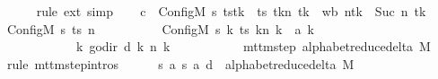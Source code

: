 \begin{isabellebody}
\ \ \ \ \isamarkupfalse%
\ {\isacharparenleft}{\kern0pt}rule\ ext{\isacharparenright}{\kern0pt}\ simp\isanewline
\ \ \isamarkupfalse%
\ {\isacharquery}{\kern0pt}c{\isacharprime}{\kern0pt}{\isacharprime}{\kern0pt}\ {\isacharequal}{\kern0pt}\ {\isachardoublequoteopen}Config\isactrlsub M\ {\isacharquery}{\kern0pt}s{\isacharprime}{\kern0pt}\ {\isacharparenleft}{\kern0pt}ts{\isacharparenleft}{\kern0pt}tk\ {\isacharcolon}{\kern0pt}{\isacharequal}{\kern0pt}\ {\isacharparenleft}{\kern0pt}ts\ tk{\isacharparenright}{\kern0pt}{\isacharparenleft}{\kern0pt}n\ tk\ {\isacharcolon}{\kern0pt}{\isacharequal}{\kern0pt}\ {\isacharquery}{\kern0pt}wb{\isacharparenright}{\kern0pt}{\isacharparenright}{\kern0pt}{\isacharparenright}{\kern0pt}\ {\isacharparenleft}{\kern0pt}n{\isacharparenleft}{\kern0pt}tk\ {\isacharcolon}{\kern0pt}{\isacharequal}{\kern0pt}\ Suc\ {\isacharparenleft}{\kern0pt}n\ tk{\isacharparenright}{\kern0pt}{\isacharparenright}{\kern0pt}{\isacharparenright}{\kern0pt}{\isachardoublequoteclose}\isanewline
\ \ \isamarkupfalse%
\ {\isachardoublequoteopen}{\isacharparenleft}{\kern0pt}Config\isactrlsub M\ {\isacharquery}{\kern0pt}s\ ts\ n{\isacharcomma}{\kern0pt}\isanewline
\ \ \ \ \ \ \ \ \ \ Config\isactrlsub M\ {\isacharquery}{\kern0pt}s{\isacharprime}{\kern0pt}\ {\isacharparenleft}{\kern0pt}{\isasymlambda}k{\isachardot}{\kern0pt}\ {\isacharparenleft}{\kern0pt}ts\ k{\isacharparenright}{\kern0pt}{\isacharparenleft}{\kern0pt}n\ k\ {\isacharcolon}{\kern0pt}{\isacharequal}{\kern0pt}\ {\isacharquery}{\kern0pt}a{\isacharprime}{\kern0pt}\ k{\isacharparenright}{\kern0pt}{\isacharparenright}{\kern0pt}\isanewline
\ \ \ \ \ \ \ \ \ \ \ \ {\isacharparenleft}{\kern0pt}{\isasymlambda}k{\isachardot}{\kern0pt}\ go{\isacharunderscore}{\kern0pt}dir\ {\isacharparenleft}{\kern0pt}{\isacharquery}{\kern0pt}d\ k{\isacharparenright}{\kern0pt}\ {\isacharparenleft}{\kern0pt}n\ k{\isacharparenright}{\kern0pt}{\isacharparenright}{\kern0pt}{\isacharparenright}{\kern0pt}\isanewline
\ \ \ \ \ \ \ \ \ \ {\isasymin}\ mttm{\isacharunderscore}{\kern0pt}step\ {\isacharparenleft}{\kern0pt}alphabet{\isacharunderscore}{\kern0pt}reduce{\isacharunderscore}{\kern0pt}delta\ M{\isacharparenright}{\kern0pt}{\isachardoublequoteclose}\isanewline
\ \ \isamarkupfalse%
\ {\isacharparenleft}{\kern0pt}rule\ mttm{\isacharunderscore}{\kern0pt}step{\isachardot}{\kern0pt}intros{\isacharparenright}{\kern0pt}\isanewline
\ \ \ \ \isamarkupfalse%
\ {\isachardoublequoteopen}{\isacharparenleft}{\kern0pt}{\isacharquery}{\kern0pt}s{\isacharcomma}{\kern0pt}\ {\isacharquery}{\kern0pt}a{\isacharcomma}{\kern0pt}\ {\isacharquery}{\kern0pt}s{\isacharprime}{\kern0pt}{\isacharcomma}{\kern0pt}\ {\isacharquery}{\kern0pt}a{\isacharprime}{\kern0pt}{\isacharcomma}{\kern0pt}\ {\isacharquery}{\kern0pt}d{\isacharparenright}{\kern0pt}\ {\isasymin}\ alphabet{\isacharunderscore}{\kern0pt}reduce{\isacharunderscore}{\kern0pt}delta\ M{\isachardoublequoteclose}\ \isamarkupfalse%

\end{isabellebody}
